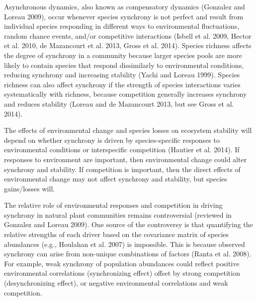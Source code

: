 \documentclass[12pt,]{article}
\begin{document}
Asynchronous dynamics, also known as compensatory dynamics (Gonzalez and Loreau 2009),
occur whenever species synchrony is not perfect and
result from individual species responding in different ways to
environmental fluctuations, random chance events, and/or competitive
interactions (Isbell et al. 2009, Hector et al. 2010, {{de Mazancourt}}
et al. 2013, Gross et al. 2014). Species richness affects
the degree of synchrony in a community because larger
species pools are more likely to contain species that respond
dissimilarly to environmental conditions, reducing synchrony and
increasing stability (Yachi and Loreau 1999).
Species richness can also affect synchrony if the strength of species interactions varies systematically with richness, because competition generally increases synchrony and reduces stability
(Loreau and {{de Mazancourt}} 2013, but see Gross et al. 2014).

The effects of environmental change and species losses on ecosystem stability will depend on whether synchrony is driven by species-specific responses to environmental conditions or interspecific competition
(Hautier et al. 2014).
If responses to environment are important, then environmental change could alter synchrony and stability.
If competition is important, then the direct effects of environmental change may not affect synchrony and stability, but species gains/losses will.

The relative role of environmental responses and competition in driving synchrony  in natural plant communities
remains controversial (reviewed in Gonzalez and Loreau 2009). One source
of the controversy is that quantifying the relative strengths of each
driver based on the covariance matrix of species abundances (e.g.,
Houlahan et al. 2007) is impossible. This is because observed synchrony
can arise from non-unique combinations of factors (Ranta et al. 2008).
For example, weak synchrony of population abundances could reflect
positive environmental correlations (synchronizing effect) offset by
strong competition (desynchronizing effect), or negative environmental
correlations and weak competition.
\end{document}
